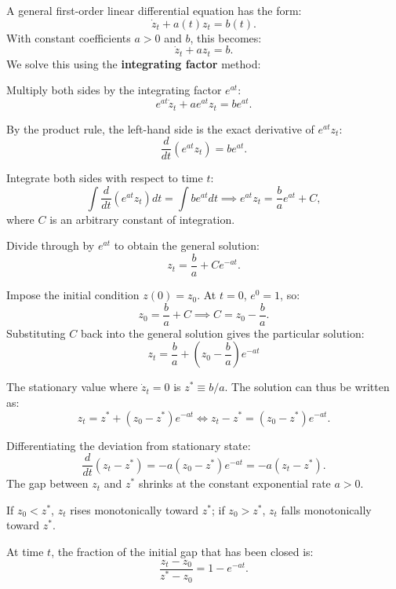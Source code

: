 \documentclass[11pt]{article}
\begin{document}
A general first-order linear differential equation has the form:
\[
\dot{z}_t + a(t)z_t = b(t).
\]
With constant coefficients $a > 0$ and $b$, this becomes:
\[
\dot{z}_t + a z_t = b.
\]
We solve this using the \textbf{integrating factor} method:
\begin{flatnum}
  \item Multiply both sides by the integrating factor $e^{at}$:
  \[
  e^{at}\dot{z}_t + a e^{at} z_t = b e^{at}.
  \]
  \item By the product rule, the left-hand side is the exact derivative of $e^{at} z_t$:
  \[
  \frac{d}{dt}\left(e^{at} z_t\right) = b e^{at}.
  \]
  \item Integrate both sides with respect to time $t$:
  \[
  \int \frac{d}{dt}\left(e^{at} z_t\right)dt = \int b e^{at} dt \implies e^{at} z_t = \frac{b}{a} e^{at} + C,
  \]
  where $C$ is an arbitrary constant of integration.
  \item Divide through by $e^{at}$ to obtain the general solution:
  \[
  z_t = \frac{b}{a} + C e^{-at}.
  \]
  \item Impose the initial condition $z(0) = z_0$. At $t = 0$, $e^0 = 1$, so:
  \[
  z_0 = \frac{b}{a} + C \implies C = z_0 - \frac{b}{a}.
  \]
  Substituting $C$ back into the general solution gives the particular solution:
  \[
  \boxed{z_t = \frac{b}{a} + \left(z_0 - \frac{b}{a}\right)e^{-at}}
  \]
\end{flatnum}

The stationary value where $\dot{z}_t = 0$ is $z^* \equiv b/a$. The solution can thus be written as:
\[
z_t = z^* + (z_0 - z^*)e^{-at} \iff z_t - z^* = (z_0 - z^*)e^{-at}.
\]
\begin{flatlist}
  \item Differentiating the deviation from stationary state:
  \[
  \frac{d}{dt}(z_t - z^*) = -a (z_0 - z^*)e^{-at} = -a(z_t - z^*).
  \]
  The gap between $z_t$ and $z^*$ shrinks at the constant exponential rate $a > 0$.
  \item If $z_0 < z^*$, $z_t$ rises monotonically toward $z^*$; if $z_0 > z^*$, $z_t$ falls monotonically toward $z^*$.
  \item At time $t$, the fraction of the initial gap that has been closed is:
  \[
  \frac{z_t - z_0}{z^* - z_0} = 1 - e^{-at}.
  \]
\end{flatlist}
\end{document}
